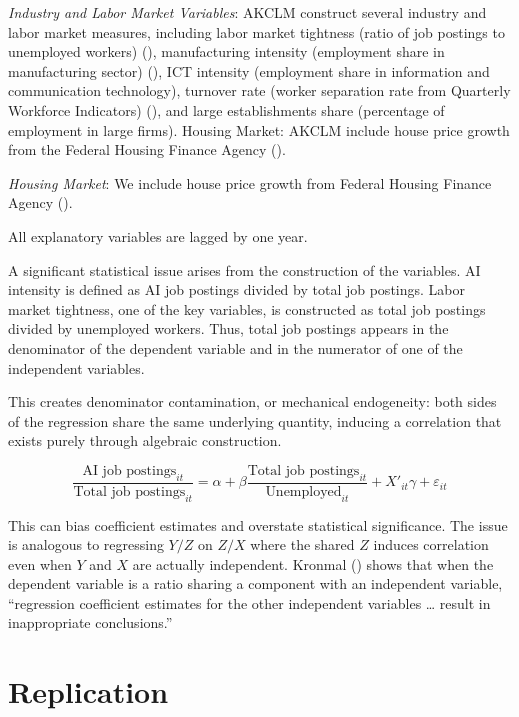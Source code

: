 \documentclass[
]{article}
\begin{document}
\emph{Industry and Labor Market Variables}: AKCLM construct several
industry and labor market measures, including labor market tightness
(ratio of job postings to unemployed workers)
(),
manufacturing intensity (employment share in manufacturing sector)
(), ICT intensity
(employment share in information and communication technology), turnover
rate (worker separation rate from Quarterly Workforce Indicators)
(), and large
establishments share (percentage of employment in large firms). Housing
Market: AKCLM include house price growth from the Federal Housing
Finance Agency ().

\emph{Housing Market}: We include house price growth from Federal
Housing Finance Agency ().

All explanatory variables are lagged by one year.

A significant statistical issue arises from the construction of the
variables. AI intensity is defined as AI job postings divided by total
job postings. Labor market tightness, one of the key variables, is
constructed as total job postings divided by unemployed workers. Thus,
total job postings appears in the denominator of the dependent variable
and in the numerator of one of the independent variables.

This creates denominator contamination, or mechanical endogeneity: both
sides of the regression share the same underlying quantity, inducing a
correlation that exists purely through algebraic construction.

\[
\frac{\text{AI job postings}_{it}}{\text{Total job postings}_{it}} = \alpha + \beta \frac{\text{Total job postings}_{it}}{\text{Unemployed}_{it}} + X'_{it}\gamma + \varepsilon_{it} \tag{3}
\]

This can bias coefficient estimates and overstate statistical
significance. The issue is analogous to regressing \(Y/Z\) on \(Z/X\)
where the shared \(Z\) induces correlation even when \(Y\) and \(X\) are
actually independent. Kronmal ()
shows that when the dependent variable is a ratio sharing a component
with an independent variable, ``regression coefficient estimates for the
other independent variables \ldots{} result in inappropriate
conclusions.''

\section{Replication}\label{replication}
\end{document}
